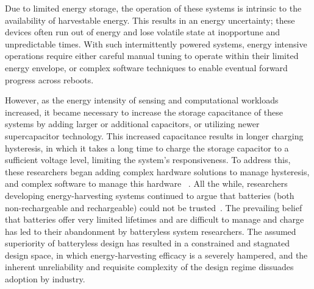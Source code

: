 Due to limited energy storage, the operation of these systems is intrinsic to the availability of harvestable energy. This results in an energy uncertainty; these devices often run out of energy and lose volatile state at inopportune and unpredictable times. With such intermittently powered systems, energy intensive operations require either careful manual tuning to operate within their limited energy envelope, or complex software techniques to enable eventual forward progress across reboots. 

However, as the energy intensity of sensing and computational workloads increased, it became necessary to increase the storage capacitance of these systems by adding larger or additional capacitors, or utilizing newer supercapacitor technology. 
This increased capacitance results in longer charging hysteresis, in which it takes a long time to charge the storage capacitor to a sufficient voltage level, limiting the system's responsiveness.
To address this,
these researchers began adding complex hardware solutions to manage hysteresis, and complex software to manage this hardware 
~\cite{colinReconfigurable18,hesterFlicker17}.
All the while, researchers developing energy-harvesting systems continued to argue that batteries (both non-rechargeable and rechargeable) could not be trusted~\cite{hesterNew17, hesterTragedy15, hesterFlicker17, hesterTimely17, hester2017future, colinReconfigurable18, luciaIntermittent17, yervaGrafting12, majid2020continuous}.
The prevailing belief that batteries offer very limited lifetimes and are difficult to manage and charge has led to their abandonment by batteryless system researchers. 
The assumed superiority of batteryless design has resulted in a constrained and stagnated design space, in which energy-harvesting efficacy is a severely hampered, and the inherent unreliability and requisite complexity of the design regime dissuades adoption by industry.

